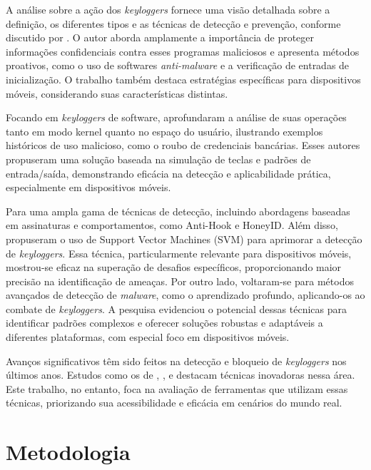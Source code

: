 \documentclass[12pt]{article}
\begin{document}
A análise sobre a ação dos \textit{keyloggers} fornece uma visão detalhada sobre a definição, os diferentes tipos e as técnicas de detecção e prevenção, conforme discutido por \citep{singh2021keylogger}. O autor aborda amplamente a importância de proteger informações confidenciais contra esses programas maliciosos e apresenta métodos proativos, como o uso de softwares \textit{anti-malware} e a verificação de entradas de inicialização. O trabalho também destaca estratégias específicas para dispositivos móveis, considerando suas características distintas.

Focando em \textit{keyloggers} de software, \citep{wajahat2019novel} aprofundaram a análise de suas operações tanto em modo kernel quanto no espaço do usuário, ilustrando exemplos históricos de uso malicioso, como o roubo de credenciais bancárias. Esses autores propuseram uma solução baseada na simulação de teclas e padrões de entrada/saída, demonstrando eficácia na detecção e aplicabilidade prática, especialmente em dispositivos móveis.

Para \citep{solairaj2016keyloggers} uma ampla gama de técnicas de detecção, incluindo abordagens baseadas em assinaturas e comportamentos, como Anti-Hook e HoneyID. Além disso, propuseram o uso de Support Vector Machines (SVM) para aprimorar a detecção de \textit{keyloggers}. Essa técnica, particularmente relevante para dispositivos móveis, mostrou-se eficaz na superação de desafios específicos, proporcionando maior precisão na identificação de ameaças. Por outro lado, \citep{aslan2020comprehensive} voltaram-se para métodos avançados de detecção de \textit{malware}, como o aprendizado profundo, aplicando-os ao combate de \textit{keyloggers}. A pesquisa evidenciou o potencial dessas técnicas para identificar padrões complexos e oferecer soluções robustas e adaptáveis a diferentes plataformas, com especial foco em dispositivos móveis.

Avanços significativos têm sido feitos na detecção e bloqueio de \textit{keyloggers} nos últimos anos. Estudos como os de \citep{singh2021keylogger}, \citep{wajahat2019novel}, \citep{solairaj2016keyloggers} e \citep{aslan2020comprehensive} destacam técnicas inovadoras nessa área. Este trabalho, no entanto, foca na avaliação de ferramentas que utilizam essas técnicas, priorizando sua acessibilidade e eficácia em cenários do mundo real.

\section{Metodologia}
\end{document}
